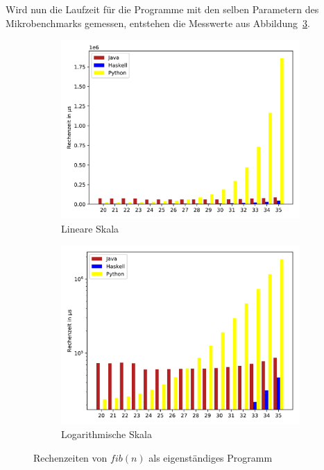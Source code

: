 \documentclass[11pt, parskip=half]{scrartcl}       %
\begin{document}
Wird nun die Laufzeit für die Programme mit den selben Parametern des Mikrobenchmarks gemessen, entstehen die Messwerte aus Abbildung~\ref{fig:bench}.

\begin{figure}[h]
  \centering
  \begin{subfigure}{0.5\textwidth}
    \centering
    \includegraphics[width=\textwidth]{src/linear-standalone.pdf}
    \caption{Lineare Skala}
    \label{fig:bench-lin}
  \end{subfigure}%
  \begin{subfigure}{0.5\textwidth}
    \centering
    \includegraphics[width=\textwidth]{src/log-standalone.pdf}
    \caption{Logarithmische Skala}
    \label{fig:bench-log}
  \end{subfigure}
  \caption{Rechenzeiten von $fib(n)$ als eigenständiges Programm}
  \label{fig:bench}
\end{figure}
\end{document}
